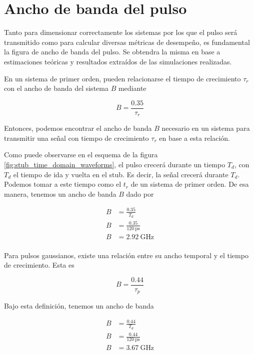 \section{Ancho de banda del pulso}
\label{sec:pulse_bandwidth}

Tanto para dimensionar correctamente los sistemas por los que el pulso será
transmitido como para calcular diversas métricas de desempeño, es fundamental la
figura de ancho de banda del pulso. Se obtendra la misma en base a estimaciones
teóricas y resultados extraídos de las simulaciones realizadas.

En un sistema de primer orden, pueden relacionarse el tiempo de crecimiento $\tau_r$ con el ancho de banda del sistema $B$ mediante \cite{oppenheim1999dsp}

\begin{equation}
    B = \frac{0.35}{\tau_r}
\end{equation}

Entonces, podemos encontrar el ancho de banda $B$ necesario en un sistema para
transmitir una señal con tiempo de crecimiento $\tau_r$ en base a esta relación.

Como puede observarse en el esquema de la figura
\ref{fig:stub_time_domain_waveforms}, el pulso crecerá durante un tiempo $T_d$,
con $T_d$ el tiempo de ida y vuelta en el stub. Es decir, la señal crecerá
durante $T_d$. Podemos tomar a este tiempo como el $t_r$ de un sistema de primer
orden. De esa manera, tenemos un ancho de banda $B$ dado por

\begin{equation}
    \begin{aligned}
        B &= \frac{0.35}{T_d} \\
        B &= \frac{0.35}{ \qty{120}{\pico\second}} \\
        B &= \qty{2.92}{\giga\hertz} \\
    \end{aligned}
\end{equation}

Para pulsos gaussianos, existe una relación entre su ancho temporal y el tiempo
de crecimiento. Esta es \cite{paschotta_gaussian_bandwidth}

\begin{equation}
    B = \frac{0.44}{\tau_p}
\end{equation}

Bajo esta definición, tenemos un ancho de banda

\begin{equation}
    \begin{aligned}
        B &= \frac{0.44}{T_d} \\
        B &= \frac{0.44}{ \qty{120}{\pico\second}} \\
        B &= \qty{3.67}{\giga\hertz} \\
    \end{aligned}
\end{equation}

